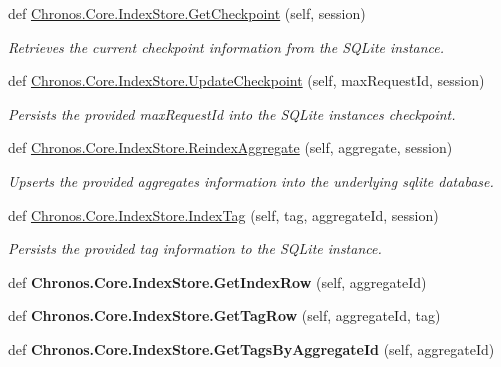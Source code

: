 \begin{DoxyCompactItemize}
\item 
def \hyperlink{group__Chronos_gac76ddb048aa12434e964963fe6b08abc}{Chronos.\+Core.\+Index\+Store.\+Get\+Checkpoint} (self, session)
\begin{DoxyCompactList}\small\item\em Retrieves the current checkpoint information from the S\+Q\+Lite instance. \end{DoxyCompactList}\item 
def \hyperlink{group__Chronos_ga999de3bf409634d23dbdce8483f38beb}{Chronos.\+Core.\+Index\+Store.\+Update\+Checkpoint} (self, max\+Request\+Id, session)
\begin{DoxyCompactList}\small\item\em Persists the provided max\+Request\+Id into the S\+Q\+Lite instance\textquotesingle{}s checkpoint. \end{DoxyCompactList}\item 
def \hyperlink{group__Chronos_gadee7d443d8b7f4f600db3e666388bfd2}{Chronos.\+Core.\+Index\+Store.\+Reindex\+Aggregate} (self, aggregate, session)
\begin{DoxyCompactList}\small\item\em Upserts the provided aggregate\textquotesingle{}s information into the underlying sqlite database. \end{DoxyCompactList}\item 
def \hyperlink{group__Chronos_ga3f3b13bc9ea88c0ff50c1da74c76baa3}{Chronos.\+Core.\+Index\+Store.\+Index\+Tag} (self, tag, aggregate\+Id, session)
\begin{DoxyCompactList}\small\item\em Persists the provided tag information to the S\+Q\+Lite instance. \end{DoxyCompactList}\item 
def {\bfseries Chronos.\+Core.\+Index\+Store.\+Get\+Index\+Row} (self, aggregate\+Id)\hypertarget{group__Chronos_ga9ff8f951ec78b029d0cf0fd6e40fadcd}{}\label{group__Chronos_ga9ff8f951ec78b029d0cf0fd6e40fadcd}

\item 
def {\bfseries Chronos.\+Core.\+Index\+Store.\+Get\+Tag\+Row} (self, aggregate\+Id, tag)\hypertarget{group__Chronos_ga7f7d088a9f6b764d14699b9972349342}{}\label{group__Chronos_ga7f7d088a9f6b764d14699b9972349342}

\item 
def {\bfseries Chronos.\+Core.\+Index\+Store.\+Get\+Tags\+By\+Aggregate\+Id} (self, aggregate\+Id)\hypertarget{group__Chronos_ga3ad55e4eb49cc32f7e2ff9584041b815}{}\label{group__Chronos_ga3ad55e4eb49cc32f7e2ff9584041b815}


\end{DoxyCompactItemize}
